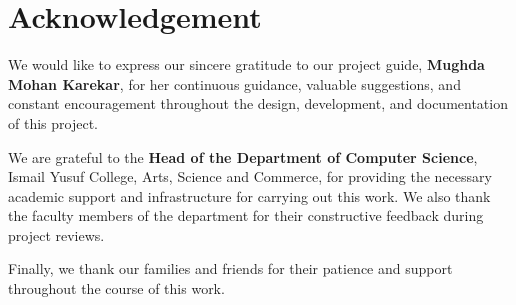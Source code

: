 \chapter*{Acknowledgement}

We would like to express our sincere gratitude to our project guide,
\textbf{Mughda Mohan Karekar}, for her continuous guidance, valuable
suggestions, and constant encouragement throughout the design, development,
and documentation of this project.

We are grateful to the \textbf{Head of the Department of Computer Science},
Ismail Yusuf College, Arts, Science and Commerce, for providing the
necessary academic support and infrastructure for carrying out this work.
We also thank the faculty members of the department for their constructive
feedback during project reviews.

Finally, we thank our families and friends for their patience and support
throughout the course of this work.